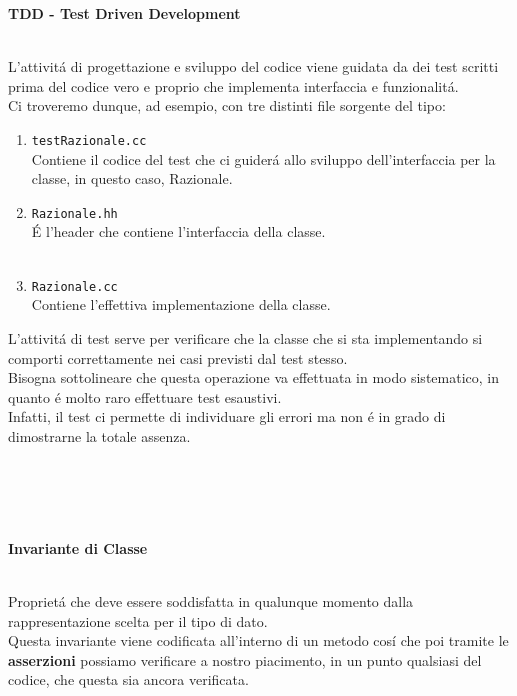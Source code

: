 \documentclass{article}
\begin{document}
\begin{large} \textbf{\textcolor{blu}{TDD - Test Driven Development}} \\ \\ \end{large}
L'attivit\'a di progettazione e sviluppo del codice viene guidata da dei test scritti prima del codice vero e proprio che implementa interfaccia e funzionalit\'a.\\Ci troveremo dunque, ad esempio, con tre distinti file sorgente del tipo:\\
\begin{enumerate}
	\item \texttt{testRazionale.cc}\\Contiene il codice del test che ci guider\'a allo sviluppo dell'interfaccia per la classe, in questo caso, Razionale. \\
	\item \texttt{Razionale.hh}\\ \'E l'header che contiene l'interfaccia della classe. \\ \\
	\item \texttt{Razionale.cc}\\Contiene l'effettiva implementazione della classe.\\
\end{enumerate}
L'attivit\'a di test serve per verificare che la classe che si sta implementando si comporti correttamente nei casi previsti dal test stesso.\\ Bisogna sottolineare che questa operazione va effettuata in modo sistematico, in quanto \'e molto raro effettuare test esaustivi.\\ Infatti, il test ci permette di individuare gli errori ma non \'e in grado di dimostrarne la totale assenza.
\\ \\ \\ \\ \\
\begin{large}\textbf{\textcolor{blu}{Invariante di Classe}} \\ \\ \end{large}
Propriet\'a che deve essere soddisfatta in qualunque momento dalla rappresentazione scelta per il tipo di dato.\\ Questa invariante viene codificata all'interno di un metodo cos\'i che poi tramite le \textbf{asserzioni} possiamo verificare a nostro piacimento, in un punto qualsiasi del codice, che questa sia ancora verificata. \\ \\
\end{document}
